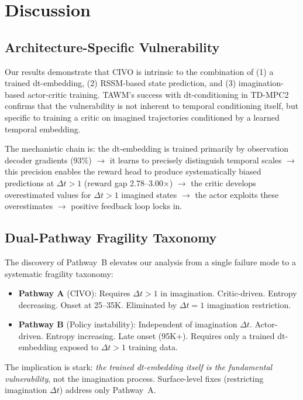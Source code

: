 \documentclass[10pt,letterpaper]{article}
\begin{document}
\section{Discussion}

\subsection{Architecture-Specific Vulnerability}

Our results demonstrate that CIVO is intrinsic to the combination of (1) a trained dt-embedding, (2) RSSM-based state prediction, and (3) imagination-based actor-critic training. TAWM's success with dt-conditioning in TD-MPC2 confirms that the vulnerability is not inherent to temporal conditioning itself, but specific to training a critic on imagined trajectories conditioned by a learned temporal embedding.

The mechanistic chain is: the dt-embedding is trained primarily by observation decoder gradients (93\%) $\to$ it learns to precisely distinguish temporal scales $\to$ this precision enables the reward head to produce systematically biased predictions at $\Delta t > 1$ (reward gap 2.78--3.00$\times$) $\to$ the critic develops overestimated values for $\Delta t > 1$ imagined states $\to$ the actor exploits these overestimates $\to$ positive feedback loop locks in.

\subsection{Dual-Pathway Fragility Taxonomy}

The discovery of Pathway~B elevates our analysis from a single failure mode to a systematic fragility taxonomy:

\begin{itemize}[nosep]
\item \textbf{Pathway A} (CIVO): Requires $\Delta t > 1$ in imagination. Critic-driven. Entropy decreasing. Onset at 25--35K. Eliminated by $\Delta t = 1$ imagination restriction.
\item \textbf{Pathway B} (Policy instability): Independent of imagination $\Delta t$. Actor-driven. Entropy increasing. Late onset (95K+). Requires only a trained dt-embedding exposed to $\Delta t > 1$ training data.
\end{itemize}

The implication is stark: \emph{the trained dt-embedding itself is the fundamental vulnerability}, not the imagination process. Surface-level fixes (restricting imagination $\Delta t$) address only Pathway~A.
\end{document}
